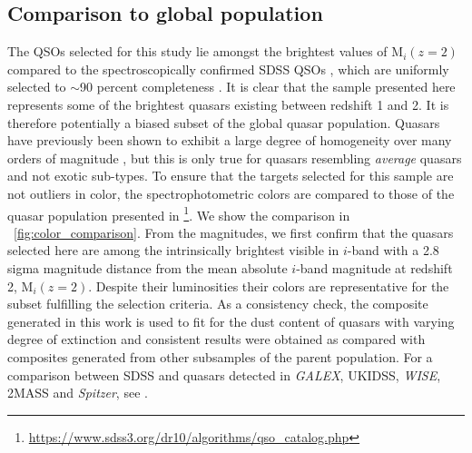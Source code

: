 \documentclass{aa}    %
\newcommand{\figref}[1]{\ref{fig:#1}}
\newcommand{\Fig}[1]{\figurename~\figref{#1}}
\newcommand{\fig}[1]{\Fig{#1}}
\newcommand{\sectlabel}[1]{\label{sect:#1}}
\newcommand{\todo}[3]{{\color{#2}\emph{#1}: #3}}
\newcommand{\jstodo}[1]{\todo{TODO }{green}{#1}}
\newcommand{\qtodo}[1]{\todo{Question}{red}{#1}}
\begin{document}
%
%

\subsection{Comparison to global population}  \sectlabel{parents}

The QSOs selected for this study lie amongst the brightest values of
M$_i(z=2)$ compared to the spectroscopically confirmed SDSS QSOs
\citep{Shen2011}, which are uniformly selected to $\sim$90 percent
completeness \citep{Richards2002, VandenBerk2005}. It is clear that
the sample presented here represents some of the brightest quasars
existing between redshift 1 and 2. It is therefore potentially a
biased subset of the global quasar population. Quasars have previously
been shown to exhibit a large degree of homogeneity over many orders
of magnitude \citep{Dietrich2002}, but this is only true for quasars
resembling \textit{average} quasars and not exotic sub-types. To
ensure that the targets selected for this sample are not outliers in
color, the spectrophotometric colors are compared to those of the
quasar population presented in
\citet{Paris2014}\footnote{\url{https://www.sdss3.org/dr10/algorithms/qso_catalog.php}}.
We
show the comparison in \fig{color_comparison}. From the magnitudes, we
first confirm that the quasars selected here are among the
intrinsically brightest visible in $i$-band with a 2.8 sigma magnitude
distance from the mean absolute $i$-band magnitude at redshift 2,
M$_i(z=2)$. Despite their luminosities their colors are representative
for the subset fulfilling the selection criteria. As a consistency
check, the composite generated in this work is used to fit for the
dust content of quasars with varying degree of extinction and
consistent results were obtained as compared with composites generated
from other subsamples of the parent population. For a comparison
between SDSS and quasars detected in \textit{GALEX}, UKIDSS,
\textit{WISE}, 2MASS and \textit{Spitzer}, see
\citet{Krawczyk2013}.
\end{document}
